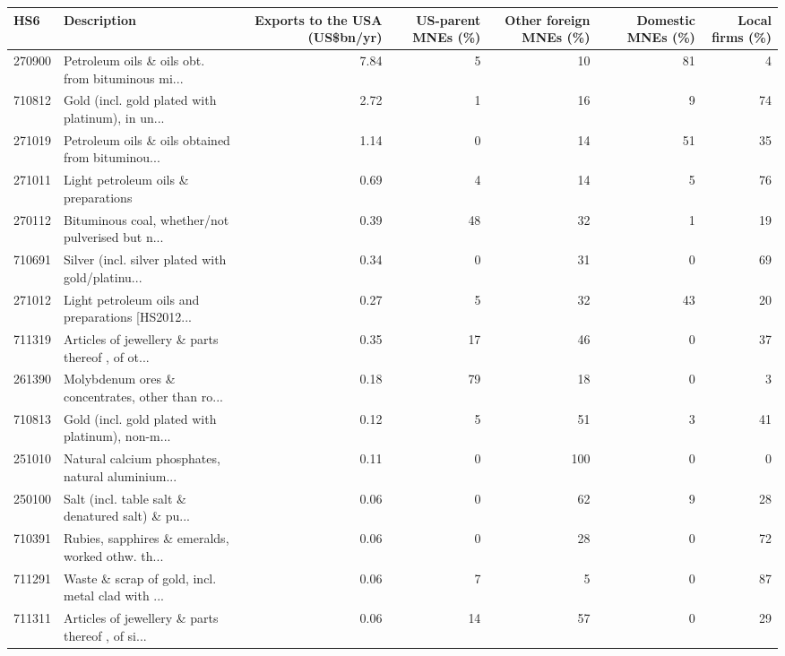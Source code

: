 \begin{tabular}{llrrrrr}
\toprule
HS6 & Description & \multicolumn{1}{p{2.0cm}}{\raggedright Exports to the USA (US\$bn/yr)} & \multicolumn{1}{p{1.8cm}}{\raggedright US-parent MNEs (\%)} & \multicolumn{1}{p{1.8cm}}{\raggedright Other foreign MNEs (\%)} & \multicolumn{1}{p{1.8cm}}{\raggedright Domestic MNEs (\%)} & \multicolumn{1}{p{1.8cm}}{\raggedright Local firms (\%)} \\
\midrule
270900 & Petroleum oils \& oils obt. from bituminous mi... & 7.84 & 5 & 10 & 81 & 4 \\
710812 & Gold (incl. gold plated with platinum), in un... & 2.72 & 1 & 16 & 9 & 74 \\
271019 & Petroleum oils \& oils obtained from bituminou... & 1.14 & 0 & 14 & 51 & 35 \\
271011 & Light petroleum oils \& preparations & 0.69 & 4 & 14 & 5 & 76 \\
270112 & Bituminous coal, whether/not pulverised but n... & 0.39 & 48 & 32 & 1 & 19 \\
710691 & Silver (incl. silver plated with gold/platinu... & 0.34 & 0 & 31 & 0 & 69 \\
271012 & Light petroleum oils and preparations [HS2012... & 0.27 & 5 & 32 & 43 & 20 \\
711319 & Articles of jewellery \& parts thereof , of ot... & 0.35 & 17 & 46 & 0 & 37 \\
261390 & Molybdenum ores \& concentrates, other than ro... & 0.18 & 79 & 18 & 0 & 3 \\
710813 & Gold (incl. gold plated with platinum), non-m... & 0.12 & 5 & 51 & 3 & 41 \\
251010 & Natural calcium phosphates, natural aluminium... & 0.11 & 0 & 100 & 0 & 0 \\
250100 & Salt (incl. table salt \& denatured salt) \& pu... & 0.06 & 0 & 62 & 9 & 28 \\
710391 & Rubies, sapphires \& emeralds, worked othw. th... & 0.06 & 0 & 28 & 0 & 72 \\
711291 & Waste \& scrap of gold, incl. metal clad with ... & 0.06 & 7 & 5 & 0 & 87 \\
711311 & Articles of jewellery \& parts thereof , of si... & 0.06 & 14 & 57 & 0 & 29 \\
\bottomrule
\end{tabular}
